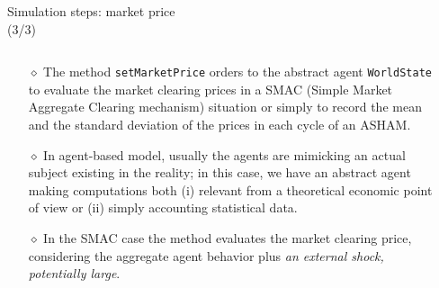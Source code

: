 \documentclass[9pt]{beamer}
\begin{document}
\begin{frame}[fragile]{Simulation steps: market price\\(3/3)}

\begin{columns}[T]
\begin{column}{.7\textwidth}
\begin{block}{}

\begin{itemize}

\item[$\diamond$] The method \verb"setMarketPrice" orders to the abstract agent \verb"WorldState" to evaluate the market clearing prices in a SMAC (Simple Market Aggregate Clearing mechanism) situation or simply to record the mean and the standard deviation of the prices in each cycle of an ASHAM. 


\item[$\diamond$] In agent-based model, usually the agents are mimicking an actual subject existing in the reality; in this case, we have an abstract agent making computations both (i) relevant from a theoretical economic point of view or (ii) simply accounting statistical data.

\item[$\diamond$] In the SMAC case the method evaluates the market clearing price, considering the aggregate agent behavior plus \emph{an external shock, potentially large}.

\end{itemize}

\end{block}
\end{column}

 \begin{column}{.3\textwidth}
 \vspace{-4.05\baselineskip}
 \begin{block}{}
  \end{block}
  \end{column}
    
\end{columns}

\end{frame}
\end{document}
